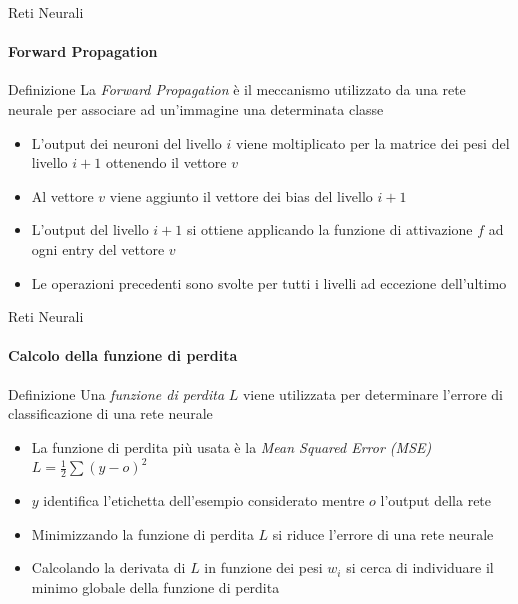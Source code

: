\documentclass[
 ]{beamer}
\begin{document}
\begin{frame}{Reti Neurali}
    \framesubtitle{Forward Propagation}
    
    \begin{block}{Definizione} 
        \large La \emph{Forward Propagation} è il meccanismo utilizzato da una rete neurale per associare ad un'immagine una determinata classe
    \end{block}\pause
    
    \smallskip
        
    \begin{itemize} [<+->]
        \setlength\itemsep{1em}
        \item \large L'output dei neuroni del livello $i$ viene moltiplicato per la matrice dei pesi del livello $i+1$ ottenendo il vettore $v$
        \item \large Al vettore $v$ viene aggiunto il vettore dei bias del livello $i+1$
        \item \large L'output del livello $i+1$ si ottiene applicando la funzione di attivazione $f$ ad ogni entry del vettore $v$
        \item \large Le operazioni precedenti sono svolte per tutti i livelli ad eccezione dell'ultimo
    \end{itemize}
\end{frame}

\begin{frame}{Reti Neurali}
    \framesubtitle{Calcolo della funzione di perdita}
    
    \begin{block}{Definizione} 
        \large Una \emph{funzione di perdita} $L$ viene utilizzata per determinare l'errore di classificazione di una rete neurale
    \end{block}\pause
        
    \begin{itemize} [<+->]
        \setlength\itemsep{1em}
        \item \large La funzione di perdita più usata è la \emph{Mean Squared Error (MSE)} $L = \frac{1}{2} \sum (y - o)^{2}$
        \item \large $y$ identifica l'etichetta dell'esempio considerato mentre $o$ l'output della rete 
        \item \large Minimizzando la funzione di perdita $L$ si riduce l'errore di una rete neurale
        \item \large Calcolando la derivata di $L$ in funzione dei pesi $w_i$ si cerca di individuare il minimo globale della funzione di perdita
    \end{itemize}
\end{frame}
\end{document}

